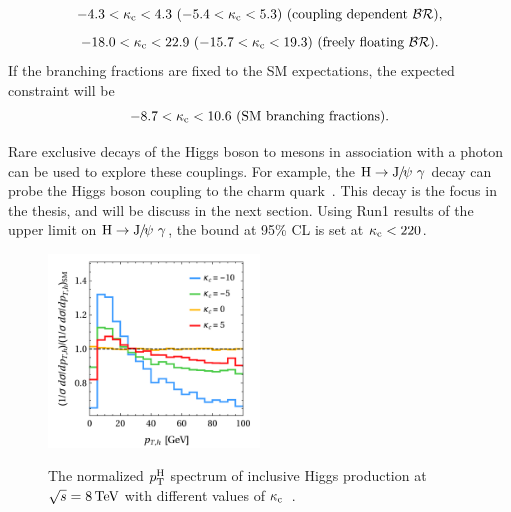 \begin{equation}
-4.3 < \kappa_{\mathrm{c}} < 4.3\ (-5.4 < \kappa_{\mathrm{c}} < 5.3)\ \text{(coupling dependent }\mathcal{BR}),
\end{equation}
\begin{equation}
-18.0 < \kappa_{\cPqc} < 22.9\ (-15.7 < \kappa_{\cPqc} < 19.3)\ \text{(freely floating }\mathcal{BR}).
\end{equation}
If the branching fractions are fixed to the SM expectations, the expected constraint will be
\begin{equation}
-8.7< \kappa_{\cPqc} < 10.6\ \text{(SM branching fractions)}.
\end{equation}

Rare exclusive decays of the Higgs boson to mesons in association with a photon can be used to explore these couplings. For example, the $\PH\to\JPsi\ \gamma$ decay can probe the Higgs boson coupling to the charm quark~\cite{Bodwin:2013gca}. This decay is the focus in the thesis, and will be discuss in the next section. Using Run1 results of the upper limit on $\PH\to\JPsi\ \gamma$, the bound at 95\% CL is set at $\kappa_{\mathrm{c}}<220$.

\begin{figure}[!ht]
\begin{center}
\includegraphics[width=0.5\textwidth]{Fig/HiggsPt_kappac}~
\caption{The normalized $p_{\text{T}}^{\mathrm{H}}$ spectrum of inclusive Higgs production at $\sqrt{s}=8\,\text{Te\hspace{-.08em}V}$ with different values of $\kappa_{\mathrm{c}}$~\cite{Bodwin:2013gca}. \label{fig:HiggsPt_KappaC}}
\end{center}
\end{figure}

